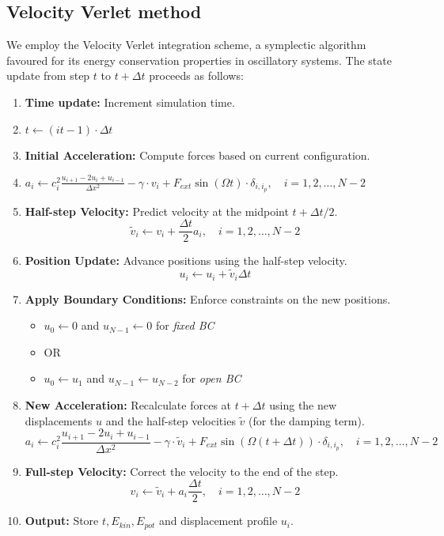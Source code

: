 \documentclass[a4paper,11pt]{article}
\begin{document}
\subsection{Velocity Verlet method}
We employ the Velocity Verlet integration scheme, a symplectic algorithm favoured for its energy conservation properties in oscillatory systems. The state update from step $t$ to $t+\Delta t$ proceeds as follows:
\begin{enumerate}
    \item \textbf{Time update:} Increment simulation time.
    \item $t \leftarrow (it - 1) \cdot \Delta t$
    \item \textbf{Initial Acceleration:} Compute forces based on current configuration.
    \item $a_i \leftarrow c_i^2 \frac{u_{i+1}-2u_i+u_{i-1}}{\Delta x^2} - \gamma \cdot v_i + F_{ext} \sin(\Omega t) \cdot \delta_{i,i_p}, \quad i = 1, 2, \dots, N - 2$
    \item \textbf{Half-step Velocity:} Predict velocity at the midpoint $t + \Delta t/2$.
    \begin{equation}
        \tilde{v}_i \leftarrow v_i + \frac{\Delta t}{2} a_i, \quad i = 1, 2, \dots, N - 2
    \end{equation}
    \item \textbf{Position Update:} Advance positions using the half-step velocity.
    \begin{equation}
        u_i \leftarrow u_i + \tilde{v}_i \Delta t
    \end{equation}
    \item \textbf{Apply Boundary Conditions:} Enforce constraints on the new positions.
    \begin{itemize}
        \item $u_0 \leftarrow 0$ and $u_{N-1} \leftarrow 0$ for \textit{fixed BC}
        \item OR
        \item $u_0 \leftarrow u_1$ and $u_{N-1} \leftarrow u_{N-2}$ for \textit{open BC}
    \end{itemize}
    \item \textbf{New Acceleration:} Recalculate forces at $t + \Delta t$ using the new displacements $u$ and the half-step velocities $\tilde{v}$ (for the damping term).
    \begin{equation}
        a_i \leftarrow c_i^2 \frac{u_{i+1}-2u_i+u_{i-1}}{\Delta x^2} - \gamma \cdot \tilde{v}_i + F_{ext} \sin(\Omega(t + \Delta t)) \cdot \delta_{i,i_p}, \quad i = 1, 2, \dots, N - 2
    \end{equation}
    \item \textbf{Full-step Velocity:} Correct the velocity to the end of the step.
    \begin{equation}
        v_i \leftarrow \tilde{v}_i + a_i \frac{\Delta t}{2}, \quad i = 1, 2, \dots, N - 2
    \end{equation}
    \item \textbf{Output:} Store $t, E_{kin}, E_{pot}$ and displacement profile $u_i$.
\end{enumerate}
\end{document}
